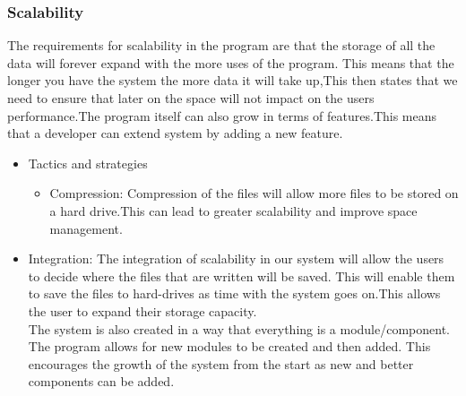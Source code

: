 
%

\subsubsection{Scalability}
\begin{flushleft}
The requirements for scalability in the program are that the storage of all the data will forever expand with the more uses of the program. This means that the longer you have the system the more data it will take up,This then states that we need to ensure that later on the space will not impact on the users performance.The program itself can also grow in terms of features.This means that a developer can extend system by adding a new feature.
\begin{itemize}
\item{Tactics and strategies}
\begin{itemize}
\item{Compression}: Compression of the files will allow more files to be stored on a hard drive.This can lead to greater scalability and improve space management.
\end{itemize}

\item{Integration}: The integration of scalability in our system will allow the users to decide where the files that are written will be saved. This will enable them to save the files to hard-drives as time with the system goes on.This allows the user to expand their storage capacity. \\
The system is also created in a way that everything is a module/component. The program allows for new modules to be created and then added. This encourages the growth of the system from the start as new and better components can be added.
\end{itemize}

\end{flushleft}
		
